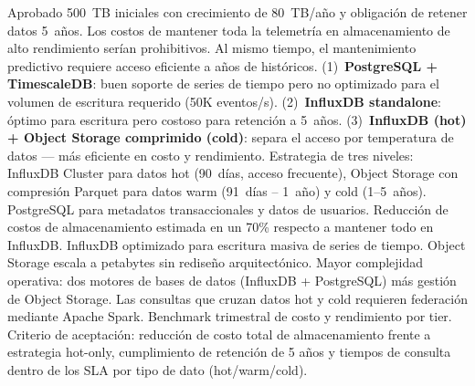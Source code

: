 \documentclass[12pt, letterpaper]{article}
\begin{document}
  {Aprobado}
  {500~TB iniciales con crecimiento de 80~TB/año y obligación de retener datos 5~años.
   Los costos de mantener toda la telemetría en almacenamiento de alto rendimiento
   serían prohibitivos. Al mismo tiempo, el mantenimiento predictivo requiere acceso
   eficiente a años de históricos.}
  {(1)~\textbf{PostgreSQL + TimescaleDB}: buen soporte de series de tiempo pero no
   optimizado para el volumen de escritura requerido (50K eventos/s).
   (2)~\textbf{InfluxDB standalone}: óptimo para escritura pero costoso para retención
   a 5~años.
   (3)~\textbf{InfluxDB (hot) + Object Storage comprimido (cold)}: separa el acceso
   por temperatura de datos --- más eficiente en costo y rendimiento.}
  {Estrategia de tres niveles: InfluxDB Cluster para datos hot (90~días, acceso
   frecuente), Object Storage con compresión Parquet para datos warm (91~días --
   1~año) y cold (1--5~años). PostgreSQL para metadatos transaccionales y datos de
   usuarios.}
  {Reducción de costos de almacenamiento estimada en un 70\% respecto a mantener todo
   en InfluxDB. InfluxDB optimizado para escritura masiva de series de tiempo. Object
   Storage escala a petabytes sin rediseño arquitectónico.}
  {Mayor complejidad operativa: dos motores de bases de datos (InfluxDB + PostgreSQL)
    más gestión de Object Storage. Las consultas que cruzan datos hot y cold requieren
    federación mediante Apache Spark.}
    {Benchmark trimestral de costo y rendimiento por tier. Criterio de aceptación:
    reducción de costo total de almacenamiento frente a estrategia hot-only,
    cumplimiento de retención de 5 años y tiempos de consulta dentro de los SLA por
    tipo de dato (hot/warm/cold).}
\end{document}
